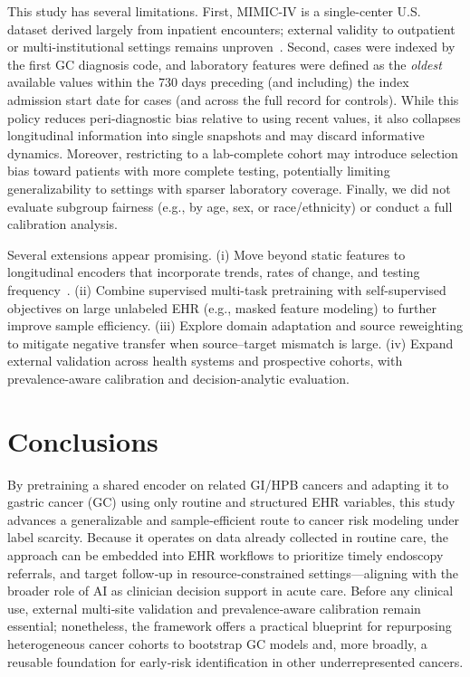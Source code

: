 \documentclass[diagnostics,article,submit,pdftex,moreauthors]{Definitions/mdpi}
\begin{document}
This study has several limitations.
First, MIMIC-IV is a single-center U.S. dataset derived largely from inpatient encounters; external validity to outpatient or multi-institutional settings remains unproven~\citep{Johnson2024MIMICIV}.
Second, cases were indexed by the first GC diagnosis code, and laboratory features were defined as the \emph{oldest} available values within the 730 days preceding (and including) the index admission start date for cases (and across the full record for controls).
While this policy reduces peri-diagnostic bias relative to using recent values, it also collapses longitudinal information into single snapshots and may discard informative dynamics.
Moreover, restricting to a lab-complete cohort may introduce selection bias toward patients with more complete testing, potentially limiting generalizability to settings with sparser laboratory coverage.
Finally, we did not evaluate subgroup fairness (e.g., by age, sex, or race/ethnicity) or conduct a full calibration analysis.

Several extensions appear promising.
(i) Move beyond static features to longitudinal encoders that incorporate trends, rates of change, and testing frequency~\citep{DeepEHR}.
(ii) Combine supervised multi-task pretraining with self-supervised objectives on large unlabeled EHR (e.g., masked feature modeling) to further improve sample efficiency. 
(iii) Explore domain adaptation and source reweighting to mitigate negative transfer when source–target mismatch is large.
(iv) Expand external validation across health systems and prospective cohorts, with prevalence-aware calibration and decision-analytic evaluation.

\section{Conclusions}
By pretraining a shared encoder on related GI/HPB cancers and adapting it to gastric cancer (GC) using only routine and structured EHR variables,
this study advances a generalizable and sample‑efficient route to cancer risk modeling under label scarcity.
Because it operates on data already collected in routine care, the approach can be embedded into EHR workflows to prioritize timely endoscopy referrals, and target follow‑up in resource‑constrained settings—aligning with the broader role of AI as clinician decision support in acute care. 
Before any clinical use, external multi‑site validation and prevalence‑aware calibration remain essential; nonetheless, the framework offers a practical blueprint for repurposing heterogeneous cancer cohorts to bootstrap GC models and, more broadly, a reusable foundation for early‑risk identification in other underrepresented cancers.
\end{document}
